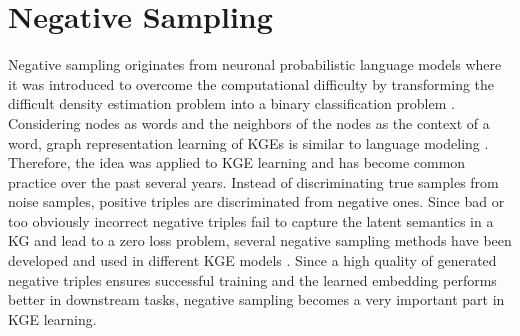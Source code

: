 \section{Negative Sampling}
\label{sec:negative_sampling}


Negative sampling originates from neuronal probabilistic language models where it was introduced to overcome the computational difficulty by transforming the difficult density estimation problem into a binary classification problem \cite{qianunderstanding}.
Considering nodes as words and the neighbors of the nodes as the context of a word, graph representation learning of \acp{KGE} is similar to language modeling \cite{qianunderstanding}.
Therefore, the idea was applied to \ac{KGE} learning and has become common practice over the past several years.
Instead of discriminating true samples from noise samples, positive triples are discriminated from negative ones.
Since bad or too obviously incorrect negative triples fail to capture the latent semantics in a \ac{KG} and lead to a zero loss problem, several negative sampling methods have been developed and used in different \ac{KGE} models \cite{qiannegative}.
Since a high quality of generated negative triples ensures successful training and the learned embedding performs better in downstream tasks, negative sampling becomes a very important part in \ac{KGE} learning.

